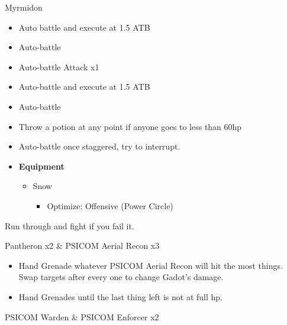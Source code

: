 \begin{multicols}{2}

\begin{battle}{Myrmidon}
\begin{itemize}
    \item Auto battle and execute at 1.5 ATB
    \item Auto-battle
    \item Auto-battle Attack x1
    \item Auto-battle and execute at 1.5 ATB
    \item Auto-battle
    \item Throw a potion at any point if anyone goes to less than 60hp
    \item Auto-battle once staggered, try to interrupt.
\end{itemize}

\end{battle}


\begin{menu}
\begin{itemize}
    \item \textbf{Equipment}
    \begin{itemize}
        \item Snow
        \begin{itemize}
            \item Optimize: Offensive (Power Circle)
        \end{itemize}
    \end{itemize}
\end{itemize}
\end{menu}

Run through and fight if you fail it.

\begin{battle}{Pantheron x2 \& PSICOM Aerial Recon x3}
\begin{itemize}
    \item Hand Grenade whatever PSICOM Aerial Recon will hit the most things. Swap targets after every one to change Gadot's damage.
    \item Hand Grenades until the last thing left is not at full hp.
\end{itemize}

\end{battle}

\begin{battle}{PSICOM Warden \& PSICOM Enforcer x2}
\end{battle}

\end{multicols}
